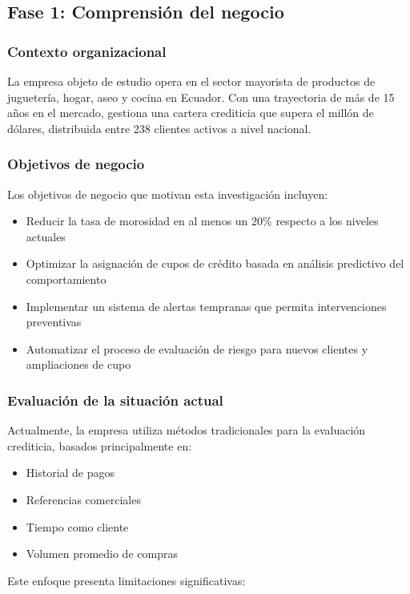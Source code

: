 \subsection{Fase 1: Comprensión del negocio}
\subsubsection{Contexto organizacional}
La empresa objeto de estudio opera en el sector mayorista de productos de juguetería, hogar, aseo y cocina en Ecuador. Con una trayectoria de más de 15 años en el mercado, gestiona una cartera crediticia que supera el millón de dólares, distribuida entre 238 clientes activos a nivel nacional.

\subsubsection{Objetivos de negocio}
Los objetivos de negocio que motivan esta investigación incluyen:

\begin{itemize}
    \item Reducir la tasa de morosidad en al menos un 20\% respecto a los niveles actuales
    \item Optimizar la asignación de cupos de crédito basada en análisis predictivo del comportamiento
    \item Implementar un sistema de alertas tempranas que permita intervenciones preventivas
    \item Automatizar el proceso de evaluación de riesgo para nuevos clientes y ampliaciones de cupo
\end{itemize}

\subsubsection{Evaluación de la situación actual}
Actualmente, la empresa utiliza métodos tradicionales para la evaluación crediticia, basados principalmente en:

\begin{itemize}
    \item Historial de pagos
    \item Referencias comerciales
    \item Tiempo como cliente
    \item Volumen promedio de compras
\end{itemize}

Este enfoque presenta limitaciones significativas:

